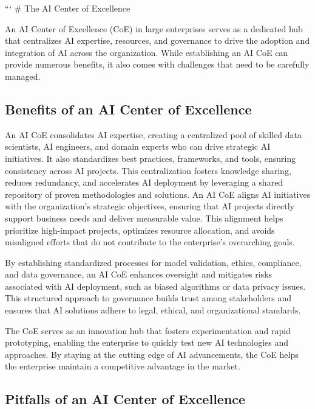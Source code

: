 ``` \# The AI Center of Excellence

An AI Center of Excellence (CoE) in large enterprises serves as a
dedicated hub that centralizes AI expertise, resources, and governance
to drive the adoption and integration of AI across the organization.
While establishing an AI CoE can provide numerous benefits, it also
comes with challenges that need to be carefully managed.

\subsection{Benefits of an AI Center of
Excellence}\label{benefits-of-an-ai-center-of-excellence}

An AI CoE consolidates AI expertise, creating a centralized pool of
skilled data scientists, AI engineers, and domain experts who can drive
strategic AI initiatives. It also standardizes best practices,
frameworks, and tools, ensuring consistency across AI projects. This
centralization fosters knowledge sharing, reduces redundancy, and
accelerates AI deployment by leveraging a shared repository of proven
methodologies and solutions. An AI CoE aligns AI initiatives with the
organization's strategic objectives, ensuring that AI projects directly
support business needs and deliver measurable value. This alignment
helps prioritize high-impact projects, optimizes resource allocation,
and avoids misaligned efforts that do not contribute to the enterprise's
overarching goals.

By establishing standardized processes for model validation, ethics,
compliance, and data governance, an AI CoE enhances oversight and
mitigates risks associated with AI deployment, such as biased algorithms
or data privacy issues. This structured approach to governance builds
trust among stakeholders and ensures that AI solutions adhere to legal,
ethical, and organizational standards.

The CoE serves as an innovation hub that fosters experimentation and
rapid prototyping, enabling the enterprise to quickly test new AI
technologies and approaches. By staying at the cutting edge of AI
advancements, the CoE helps the enterprise maintain a competitive
advantage in the market.

\subsection{Pitfalls of an AI Center of
Excellence}\label{pitfalls-of-an-ai-center-of-excellence}

